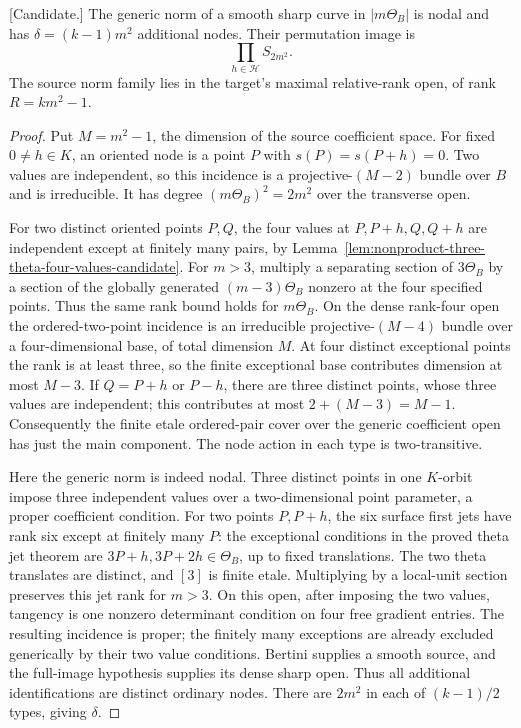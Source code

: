 \begin{lemma}
\label{lem:good-theta-uniform-node-product-candidate}
\textup{[Candidate.]}
The generic norm of a smooth sharp curve in $|m\Theta_B|$ is nodal
and has $\delta=(k-1)m^2$ additional nodes. Their permutation
image is
\[
                       \prod_{h\in\mathcal H}S_{2m^2}.
\]
The source norm family lies in the target's maximal relative-rank
open, of rank $R=km^2-1$.
\end{lemma}
\begin{proof}
Put $M=m^2-1$, the dimension of the source coefficient space.
For fixed $0\ne h\in K$, an oriented node is a point $P$ with
$s(P)=s(P+h)=0$. Two values are independent, so this incidence
is a projective-$(M-2)$ bundle over $B$ and is irreducible.
It has degree $(m\Theta_B)^2=2m^2$ over the transverse open.

For two distinct oriented points $P,Q$, the four values at
$P,P+h,Q,Q+h$ are independent except at finitely many pairs,
by Lemma~\ref{lem:nonproduct-three-theta-four-values-candidate}.
For $m>3$, multiply a separating section of $3\Theta_B$ by a
section of the globally generated $(m-3)\Theta_B$ nonzero at
the four specified points. Thus the same rank bound holds for
$m\Theta_B$. On the dense rank-four open the ordered-two-point
incidence is an irreducible projective-$(M-4)$ bundle over a
four-dimensional base, of total dimension $M$.
At four distinct exceptional points the rank is at least three,
so the finite exceptional base contributes dimension at most
$M-3$. If $Q=P+h$ or $P-h$, there are three distinct points, whose three values are independent; this contributes at most
$2+(M-3)=M-1$. Consequently the finite etale ordered-pair cover
over the generic coefficient open has just the main component.
The node action in each type is two-transitive.

Here the generic norm is indeed nodal. Three distinct points in
one $K$-orbit impose three independent values over a two-dimensional
point parameter, a proper coefficient condition. For two points
$P,P+h$, the six surface first jets have rank six except at
finitely many $P$: the exceptional conditions in the proved theta
jet theorem are $3P+h,3P+2h\in\Theta_B$, up to fixed translations.
The two theta translates are distinct, and $[3]$ is finite etale.
Multiplying by a local-unit section preserves this jet rank for
$m>3$. On this open, after imposing the two values, tangency is
one nonzero determinant condition on four free gradient entries.
The resulting incidence is proper; the finitely many exceptions
are already excluded generically by their two value conditions.
Bertini supplies a smooth source, and the full-image hypothesis
supplies its dense sharp open. Thus all additional identifications
are distinct ordinary nodes. There are $2m^2$ in each of
$(k-1)/2$ types, giving $\delta$.


\end{proof}
